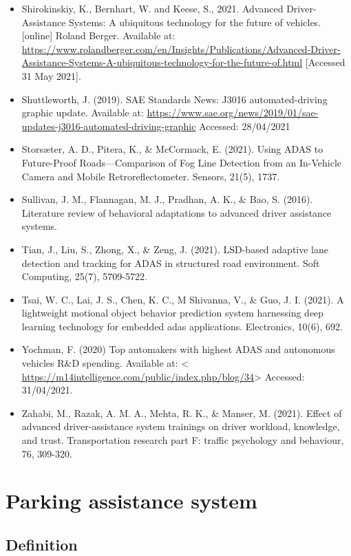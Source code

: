 \documentclass[
]{book}
\begin{document}
\begin{itemize}
\item
  Shirokinskiy, K., Bernhart, W. and Keese, S., 2021. Advanced Driver-Assistance Systems: A ubiquitous technology for the future of vehicles. {[}online{]} Roland Berger. Available at: \url{https://www.rolandberger.com/en/Insights/Publications/Advanced-Driver-Assistance-Systems-A-ubiquitous-technology-for-the-future-of.html} {[}Accessed 31 May 2021{]}.
\item
  Shuttleworth, J. (2019). SAE Standards News: J3016 automated-driving graphic update. Available at: \url{https://www.sae.org/news/2019/01/sae-updates-j3016-automated-driving-graphic} Accessed: 28/04/2021
\item
  Storsæter, A. D., Pitera, K., \& McCormack, E. (2021). Using ADAS to Future-Proof Roads---Comparison of Fog Line Detection from an In-Vehicle Camera and Mobile Retroreflectometer. Sensors, 21(5), 1737.
\item
  Sullivan, J. M., Flannagan, M. J., Pradhan, A. K., \& Bao, S. (2016). Literature review of behavioral adaptations to advanced driver assistance systems.
\item
  Tian, J., Liu, S., Zhong, X., \& Zeng, J. (2021). LSD-based adaptive lane detection and tracking for ADAS in structured road environment. Soft Computing, 25(7), 5709-5722.
\item
  Tsai, W. C., Lai, J. S., Chen, K. C., M Shivanna, V., \& Guo, J. I. (2021). A lightweight motional object behavior prediction system harnessing deep learning technology for embedded adas applications. Electronics, 10(6), 692.
\item
  Yochman, F. (2020) Top automakers with highest ADAS and autonomous vehicles R\&D spending. Available at: \textless{} \url{https://m14intelligence.com/public/index.php/blog/34}\textgreater{} Accessed: 31/04/2021.
\item
  Zahabi, M., Razak, A. M. A., Mehta, R. K., \& Manser, M. (2021). Effect of advanced driver-assistance system trainings on driver workload, knowledge, and trust. Transportation research part F: traffic psychology and behaviour, 76, 309-320.
\end{itemize}

\hypertarget{parking_assistance}{%
\section{Parking assistance system}\label{parking_assistance}}

\hypertarget{definition-24}{%
\subsection*{Definition}\label{definition-24}}
\end{document}
